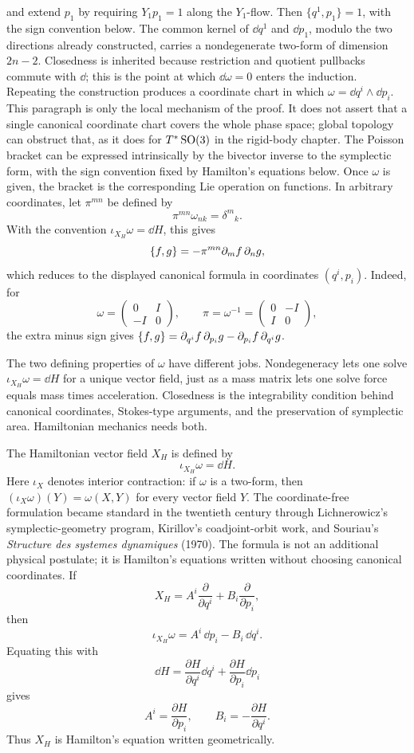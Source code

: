 and extend \(p_1\) by requiring \(Y_1p_1=1\) along the \(Y_1\)-flow. Then
\(\{q^1,p_1\}=1\), with the sign convention below. The common kernel of
\(\dd q^1\) and \(\dd p_1\), modulo the two directions already constructed,
carries a nondegenerate two-form of dimension \(2n-2\). Closedness is inherited
because restriction and quotient pullbacks commute with \(\dd\); this is the
point at which \(\dd\omega=0\) enters the induction. Repeating the
construction produces a coordinate chart in which
\(\omega=\dd q^i\wedge\dd p_i\).
This paragraph is only the local mechanism of the proof. It does not assert
that a single canonical coordinate chart covers the whole phase space; global
topology can obstruct that, as it does for \(T^*\operatorname{SO}(3)\) in the rigid-body
chapter.
The Poisson bracket can be expressed intrinsically by the bivector inverse to
the symplectic form, with the sign convention fixed by Hamilton's equations
below. Once \(\omega\) is given, the bracket is the corresponding Lie operation
on functions.
In arbitrary coordinates, let \(\pi^{mn}\) be defined by
\[
  \pi^{mn}\omega_{nk}=\delta^m{}_k.
\]
With the convention \(\iota_{X_H}\omega=\dd H\), this gives
\[
  \left\{f,g\right\}
  =
  -\pi^{mn}\partial_m f\,\partial_n g,
\]
which reduces to the displayed canonical formula in coordinates
\((q^i,p_i)\).
Indeed, for
\[
  \omega=
  \begin{pmatrix}
  0&I\\ -I&0
  \end{pmatrix},
  \qquad
  \pi=\omega^{-1}=
  \begin{pmatrix}
  0&-I\\ I&0
  \end{pmatrix},
\]
the extra minus sign gives
\(\left\{f,g\right\}=\partial_{q^i}f\,\partial_{p_i}g
-\partial_{p_i}f\,\partial_{q^i}g\).

The two defining properties of \(\omega\) have different jobs. Nondegeneracy
lets one solve \(\iota_{X_H}\omega=\dd H\) for a unique vector field, just as a
mass matrix lets one solve force equals mass times acceleration. Closedness is
the integrability condition behind canonical coordinates, Stokes-type
arguments, and the preservation of symplectic area. Hamiltonian mechanics needs
both.

The Hamiltonian vector field \(X_H\) is defined by
\[
  \iota_{X_H}\omega=\dd H.
\]
Here \(\iota_X\) denotes interior contraction: if \(\omega\) is a two-form, then
\((\iota_X\omega)(Y)=\omega(X,Y)\) for every vector field \(Y\).
The coordinate-free formulation became standard in the twentieth century
through Lichnerowicz's symplectic-geometry program, Kirillov's coadjoint-orbit
work, and Souriau's \emph{Structure des systemes dynamiques} (1970). The
formula is not an additional physical postulate; it is Hamilton's equations
written without choosing canonical coordinates.
If
\[
  X_H=A^i\frac{\partial}{\partial q^i}
  +
  B_i\frac{\partial}{\partial p_i},
\]
then
\[
  \iota_{X_H}\omega=A^i\,\dd p_i-B_i\,\dd q^i.
\]
Equating this with
\[
  \dd H=\frac{\partial H}{\partial q^i}\dd q^i
  +
  \frac{\partial H}{\partial p_i}\dd p_i
\]
gives
\[
  A^i=\frac{\partial H}{\partial p_i},
  \qquad
  B_i=-\frac{\partial H}{\partial q^i}.
\]
Thus \(X_H\) is Hamilton's equation written geometrically.

